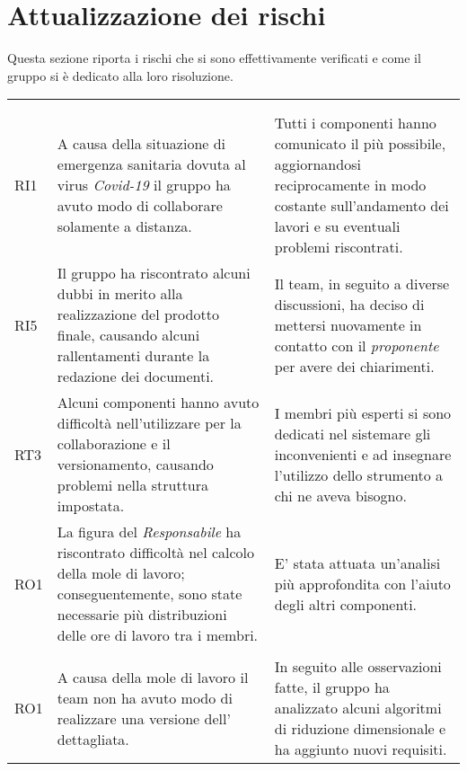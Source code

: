 \section{Attualizzazione dei rischi}

Questa sezione riporta i rischi che si sono effettivamente verificati e come il gruppo si è dedicato alla loro risoluzione.
\setlength\arrayrulewidth{1pt}
\begin{longtable}{C{1cm} | C{8cm} | C{7cm}} 
 	 &
 	 &
 	 \\
 	
 	 \\
 	
 	RI1 & A causa della situazione di emergenza sanitaria dovuta al virus \textit{Covid-19} il gruppo ha avuto modo di collaborare solamente a distanza. & Tutti i componenti hanno comunicato il più possibile, aggiornandosi reciprocamente in modo costante sull'andamento dei lavori e su eventuali problemi riscontrati. \\
 	RI5 & Il gruppo ha riscontrato alcuni dubbi in merito alla realizzazione del prodotto finale, causando alcuni rallentamenti durante la redazione dei documenti. & Il team, in seguito a diverse discussioni, ha deciso di mettersi nuovamente in contatto con il \textit{proponente} per avere dei chiarimenti. \\
 	RT3 & Alcuni componenti hanno avuto difficoltà nell'utilizzare  per la collaborazione e il versionamento, causando problemi nella struttura impostata. & I membri più esperti si sono dedicati nel sistemare gli inconvenienti e ad insegnare l'utilizzo dello strumento a chi ne aveva bisogno. \\
 	RO1 & La figura del \textit{Responsabile} ha riscontrato difficoltà nel calcolo della mole di lavoro; conseguentemente, sono state necessarie più distribuzioni delle ore di lavoro tra i membri. & E' stata attuata un'analisi più approfondita con l'aiuto degli altri componenti. \\
 		
 	 \\
 	
 	RO1 & A causa della mole di lavoro il team non ha avuto modo di realizzare una versione dell'\AdRv{} dettagliata. &  In seguito alle osservazioni fatte, il gruppo ha analizzato alcuni algoritmi di riduzione dimensionale e ha aggiunto nuovi requisiti. \\
 	

\end{longtable}
